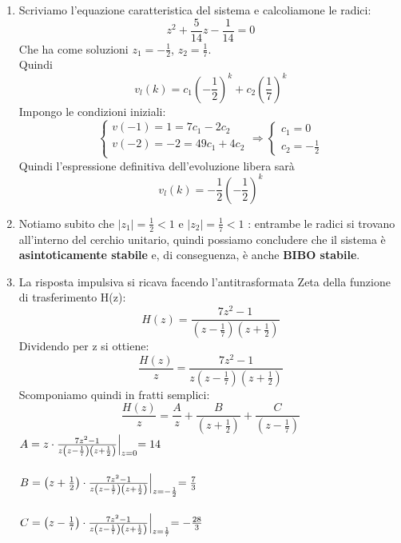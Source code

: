 \documentclass[12pt,a4paper]{article}
\begin{document}
	\begin{enumerate}
		\item Scriviamo l'equazione caratteristica del sistema e calcoliamone le radici:
		\[
			z^2 + \frac{5}{14}z -\frac{1}{14} = 0
		\]
		Che ha come soluzioni $z_1 = -\frac{1}{2}$, $z_2 = \frac{1}{7}$.\\
		Quindi
		\[
			v_l(k) = c_1\left(-\frac{1}{2}\right)^k + c_2\left(\frac{1}{7}\right)^k
		\]
		Impongo le condizioni iniziali:
		\[
			\begin{cases}
				v(-1) = 1 = 7c_1 - 2c_2\\
				v(-2) = -2 = 49c_1 + 4c_2\\
			\end{cases}
			\Rightarrow
			\begin{cases}
				c_1 = 0\\
				c_2 = -\frac{1}{2}
			\end{cases}
		\]
		Quindi l'espressione definitiva dell'evoluzione libera sar\`a
		\[
			v_l(k) = -\frac{1}{2}\left(-\frac{1}{2}\right)^k
		\]
		\item Notiamo subito che $|z_1| = \frac{1}{2} < 1$ e $|z_2| = \frac{1}{7} < 1$ : entrambe le radici si trovano all'interno del cerchio unitario, quindi possiamo concludere che il sistema \`e \textbf{asintoticamente stabile} e, di conseguenza, \`e anche \textbf{BIBO stabile}.
		\item La risposta impulsiva si ricava facendo l'antitrasformata Zeta della funzione di trasferimento H(z):
		\[
			H(z) = \frac{7z^2-1}{\left(z - \frac{1}{7}\right) \left(z + \frac{1}{2}\right)}
		\]
		Dividendo per z si ottiene:
		\[
				\frac{H(z)}{z} = \frac{7z^2-1}{z\left(z - \frac{1}{7}\right) \left(z + \frac{1}{2}\right)}
		\]
		Scomponiamo quindi in fratti semplici:
		\[
			\frac{H(z)}{z} = \frac{A}{z} + \frac{B}{ \left(z + \frac{1}{2}\right)} + \frac{C}{\left(z - \frac{1}{7}\right)}
		\]
		$A = z \cdot \frac{7z^2-1}{z\left(z - \frac{1}{7}\right) \left(z + \frac{1}{2}\right)}\Bigl\lvert_{z = 0} = 14$\\ \\
		$B = \left( z + \frac{1}{2}\right) \cdot \frac{7z^2-1}{z\left(z - \frac{1}{7}\right) \left(z + \frac{1}{2}\right)} \Bigl\lvert_{z = -\frac{1}{2}} = \frac{7}{3}$ \\ \\
		$C = \left( z - \frac{1}{7}\right) \cdot \frac{7z^2-1}{z\left(z - \frac{1}{7}\right) \left(z + \frac{1}{2}\right)} \Bigl\lvert_{z = \frac{1}{7}} = -\frac{28}{3}$ \\ \\

\end{enumerate}
\end{document}
